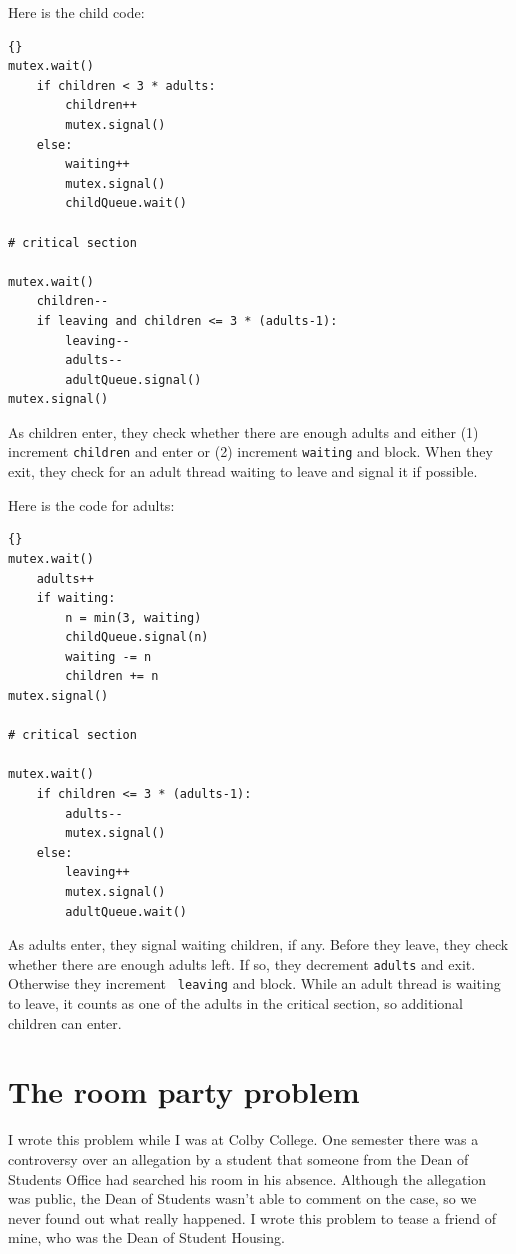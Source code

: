 \documentclass{book}
\begin{document}
Here is the child code:

\begin{lstlisting}[caption={Extended child care solution (child)}]{}
mutex.wait()
    if children < 3 * adults:
        children++
        mutex.signal()
    else:
        waiting++
        mutex.signal()
        childQueue.wait()

# critical section

mutex.wait()
    children--
    if leaving and children <= 3 * (adults-1):
        leaving--
        adults--
        adultQueue.signal() 
mutex.signal()
\end{lstlisting}

As children enter, they check whether there are enough adults
and either (1) increment {\tt children} and enter or (2) increment
{\tt waiting} and block.
When they exit, they check for an adult thread waiting to leave and
signal it if possible.

\newpage
Here is the code for adults:

\begin{lstlisting}[caption={Extended child care solution (adult)}]{}
mutex.wait()
    adults++
    if waiting:
        n = min(3, waiting)
        childQueue.signal(n)
        waiting -= n
        children += n
mutex.signal()

# critical section

mutex.wait()
    if children <= 3 * (adults-1):
        adults--
        mutex.signal()
    else:
        leaving++
        mutex.signal()
        adultQueue.wait() 
\end{lstlisting}

As adults enter, they signal waiting children, if any.  Before they
leave, they check whether there are enough adults left.  If so, they
decrement {\tt adults} and exit.  Otherwise they increment {\tt
leaving} and block.  While an adult thread is waiting to leave, it
counts as one of the adults in the critical section, so additional
children can enter.





\newpage
\section{The room party problem}

I wrote this problem while I was at Colby College.  One semester
there was a controversy over an allegation by a student that someone
from the Dean of Students Office had searched his room in his
absence.  Although the allegation was public, the Dean of Students
wasn't able to comment on the case, so we never found out what
really happened.  I wrote this problem to tease a friend of mine,
who was the Dean of Student Housing.
\end{document}
